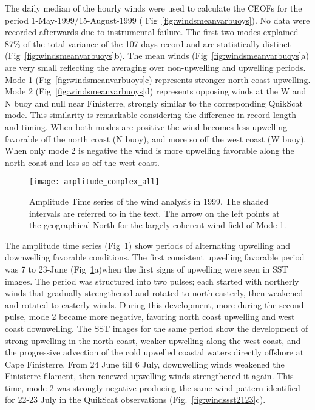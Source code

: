 The daily median of the hourly winds were used to calculate the
CEOFs for the period 1-May-1999/15-August-1999 (
{Fig~\ref{fig:windsmeanvarbuoys}}). No data were recorded
afterwards due to instrumental failure. The first two modes
explained 87\% of the total variance of the 107 days record and
are statistically distinct (Fig~\ref{fig:windsmeanvarbuoys}b). The
mean winds (Fig~\ref{fig:windsmeanvarbuoys}a) are very small
reflecting the averaging over non-upwelling and upwelling periods.
Mode 1 (Fig~\ref{fig:windsmeanvarbuoys}c) represents stronger
north coast upwelling. Mode 2 (Fig~\ref{fig:windsmeanvarbuoys}d)
represents opposing winds at the W  and N buoy and null near
Finisterre, strongly similar to the corresponding QuikScat mode.
This similarity is remarkable considering the difference in record
length and timing. When both modes are positive the wind becomes
less upwelling favorable off the north coast (N buoy), and more so
off the west coast (W buoy). When only mode 2 is negative the wind
is more upwelling favorable along the north coast and less so off
the west coast.
\begin{figure}[t]
\texttt{[image: amplitude\_complex\_all]}
\caption{Amplitude Time series of the wind analysis in 1999. The
shaded intervals are referred to in the text. The arrow on the
left points at the geographical North for the largely coherent
wind field of Mode 1.}\label{fig:windsampbuoys}
\end{figure}

The amplitude time series ({Fig~\ref{fig:windsampbuoys}}) show
periods of alternating upwelling and downwelling favorable
conditions. The first consistent upwelling favorable period was
 7 to 23-June (Fig~\ref{fig:windsampbuoys}a)when the first signs of
upwelling were seen in SST images. The period was structured into
two pulses; each started with northerly winds that gradually
strengthened and rotated to north-easterly, then weakened and
rotated to easterly winds. During this development, more during
the second pulse, mode 2 became more negative, favoring north
coast upwelling and west coast downwelling. The SST images for the
same period show the development of strong upwelling in the north
coast, weaker upwelling along the west coast, and the progressive
advection of the cold upwelled coastal waters directly offshore at
Cape Finisterre. From 24 June till 6 July, downwelling winds
weakened the Finisterre filament, then renewed upwelling winds
strengthened it again. This time, mode 2 was strongly negative
producing the same wind pattern identified for 22-23 July in the
QuikScat observations (Fig.~\ref{fig:windssst2123}c).

